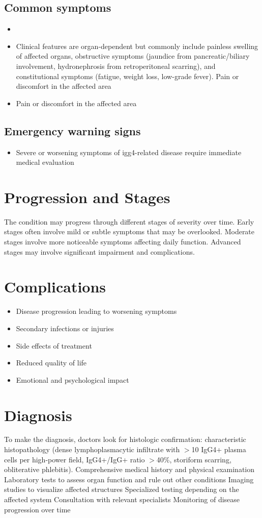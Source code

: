 \subsection{Common symptoms}
\begin{itemize}[noitemsep]
  \item \item Clinical features are organ-dependent but commonly include painless swelling of affected organs, obstructive symptoms (jaundice from pancreatic/biliary involvement, hydronephrosis from retroperitoneal scarring), and constitutional symptoms (fatigue, weight loss, low-grade fever). Pain or discomfort in the affected area    \item Pain or discomfort in the affected area
  \end{itemize}

\subsection{Emergency warning signs}
\begin{itemize}[noitemsep]
  \item Severe or worsening symptoms of igg4-related disease require immediate medical evaluation
\end{itemize}
\section{Progression and Stages}
The condition may progress through different stages of severity over time. Early stages often involve mild or subtle symptoms that may be overlooked. Moderate stages involve more noticeable symptoms affecting daily function. Advanced stages may involve significant impairment and complications.
\section{Complications}
\begin{itemize}[noitemsep]
  \item Disease progression leading to worsening symptoms
  \item Secondary infections or injuries
  \item Side effects of treatment
  \item Reduced quality of life
  \item Emotional and psychological impact
\end{itemize}
\section{Diagnosis}
To make the diagnosis, doctors look for histologic confirmation: characteristic histopathology (dense lymphoplasmacytic infiltrate with $>$10 IgG4+ plasma cells per high-power field, IgG4+/IgG+ ratio $>$40\%, storiform scarring, obliterative phlebitis). Comprehensive medical history and physical examination Laboratory tests to assess organ function and rule out other conditions Imaging studies to visualize affected structures Specialized testing depending on the affected system Consultation with relevant specialists Monitoring of disease progression over time

